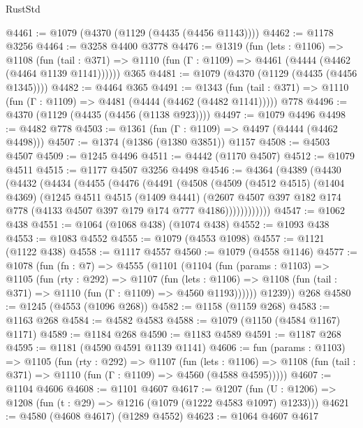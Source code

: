\begin{lexlean}{RustStd}
\begin{coremodule}
@4461 := @1079 (@4370 (@1129 (@4435 (@4456 @1143))))
@4462 := @1178 @3256
@4464 := @3258 @4400 @3778
@4476 := @1319
    (fun (lets : @1106) =>
    @1108
      (fun (tail : @371) => @1110 (fun (Γ : @1109) => @4461 (@4444 (@4462 (@4464 @1139 @1141))))))
    @365
@4481 := @1079 (@4370 (@1129 (@4435 (@4456 @1345))))
@4482 := @4464 @365
@4491 := @1343
    (fun (tail : @371) => @1110 (fun (Γ : @1109) => @4481 (@4444 (@4462 (@4482 @1141)))))
    @778
@4496 := @4370 (@1129 (@4435 (@4456 (@1138 @923))))
@4497 := @1079 @4496
@4498 := @4482 @778
@4503 := @1361 (fun (Γ : @1109) => @4497 (@4444 (@4462 @4498)))
@4507 := @1374 (@1386 (@1380 @3851)) @1157
@4508 := @4503 @4507
@4509 := @1245 @4496
@4511 := @4442 (@1170 @4507)
@4512 := @1079 @4511
@4515 := @1177 @4507 @3256 @4498
@4546 := @4364
    (@4389
      (@4430
        (@4432
          (@4434
            (@4455
              (@4476
                (@4491
                  (@4508
                    (@4509
                      (@4512 @4515)
                      (@1404 @4369)
                      (@1245
                        @4511
                        @4515
                        (@1409 @4441)
                        (@2607
                          @4507
                          @397
                          @182
                          @174
                          @778
                          (@4133 @4507 @397 @179 @174 @777 @4186))))))))))))
@4547 := @1062 @438
@4551 := @1064 (@1068 @438) (@1074 @438)
@4552 := @1093 @438
@4553 := @1083 @4552
@4555 := @1079 (@4553 @1098)
@4557 := @1121 (@1122 @438)
@4558 := @1117 @4557
@4560 := @1079 (@4558 @1146)
@4577 := @1078
    (fun (fn : @7) =>
    @4555
      (@1101
        (@1104
          (fun (params : @1103) =>
          @1105
            (fun (rty : @292) =>
            @1107
              (fun (lets : @1106) =>
              @1108 (fun (tail : @371) => @1110 (fun (Γ : @1109) => @4560 @1193))))))
        @1239))
    @268
@4580 := @1245 (@4553 (@1096 @268))
@4582 := @1158 (@1159 @268)
@4583 := @1163 @268
@4584 := @4582 @4583
@4588 := @1079 (@1150 (@4584 @1167) @1171)
@4589 := @1184 @268
@4590 := @1183 @4589
@4591 := @1187 @268
@4595 := @1181 (@4590 @4591 @1139 @1141)
@4606 := fun (params : @1103) =>
  @1105
    (fun (rty : @292) =>
    @1107
      (fun (lets : @1106) =>
      @1108 (fun (tail : @371) => @1110 (fun (Γ : @1109) => @4560 (@4588 @4595)))))
@4607 := @1104 @4606
@4608 := @1101 @4607
@4617 := @1207 (fun (U : @1206) => @1208 (fun (t : @29) => @1216 (@1079 (@1222 @4583 @1097) @1233)))
@4621 := @4580 (@4608 @4617) (@1289 @4552)
@4623 := @1064 @4607 @4617

\end{coremodule}
\end{lexlean}
